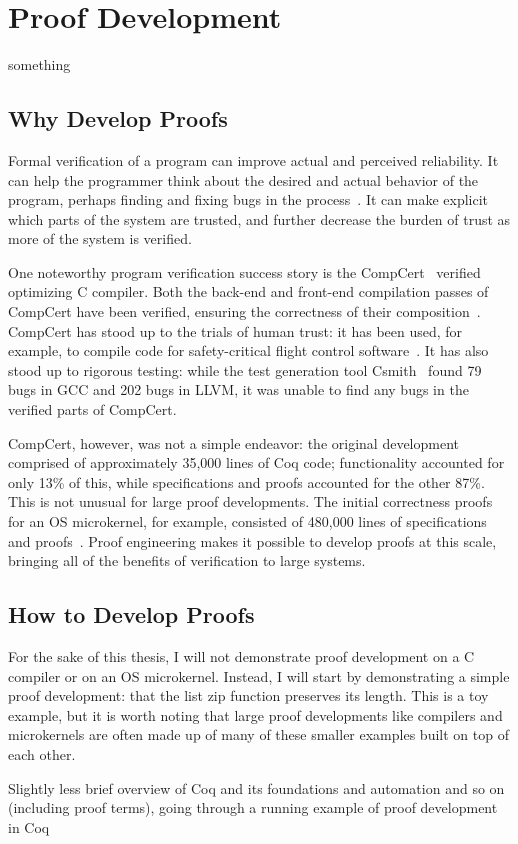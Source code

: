 
\section{Proof Development}


something

\subsection{Why Develop Proofs}

Formal verification of a program can improve actual and perceived reliability.
It can help the programmer think about the desired and actual behavior of the program,
perhaps finding and fixing bugs in the process~\cite{murraybp}.
It can make explicit which parts of the system are trusted, and further decrease the burden
of trust as more of the system is verified.

One noteworthy program verification success story is the CompCert~\cite{Leroy:POPL06, Leroy2009} verified optimizing C compiler.
Both the back-end and front-end compilation passes
of CompCert have been verified, ensuring the correctness of their composition~\cite{Kaestner2017}.
CompCert has stood up to the trials of human trust: it has been used, for example, to compile code for safety-critical flight control software~\cite{Frana2011}.
It has also stood up to rigorous testing: while the test generation tool Csmith~\cite{Yang2011} found 
79 bugs in GCC and 202 bugs in LLVM, it was unable to find any bugs in the verified parts of CompCert.

CompCert, however, was not a simple endeavor: the original development comprised of approximately 35,000 lines of Coq code;
functionality accounted for only 13\% of this, while specifications and proofs accounted for the other 87\%.
This is not unusual for large proof developments. The initial correctness proofs for an OS microkernel,
for example, consisted of 480,000 lines of specifications and proofs~\cite{Klein2014micro}.
Proof engineering makes it possible to develop proofs at this scale,
bringing all of the benefits of verification to large systems.

\subsection{How to Develop Proofs}

For the sake of this thesis, I will not demonstrate proof development on a C compiler or on an OS microkernel.
Instead, I will start by demonstrating a simple proof development: 
that the list zip function preserves its length.
This is a toy example, but it is worth noting that large proof developments like compilers and microkernels
are often made up of many of these smaller examples built on top of each other.

Slightly less brief overview of Coq and its foundations and automation and so on (including proof terms), going through a running example of proof development in Coq

